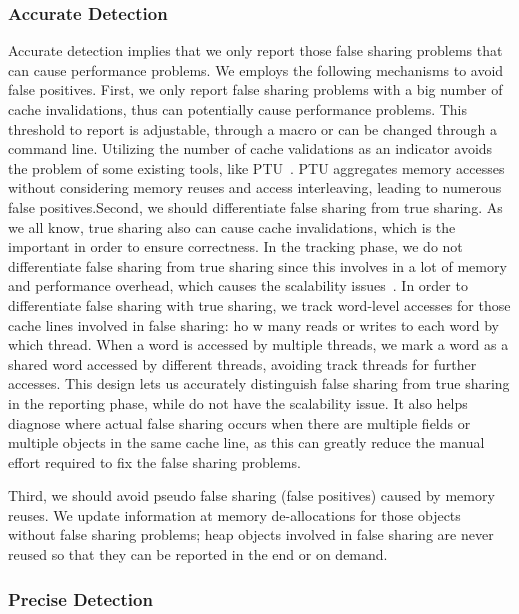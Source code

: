 \subsubsection{Accurate Detection}
\label{sec:accuratedetect}
Accurate detection implies that we only report those false sharing problems that can cause performance problems. We employs the following mechanisms to avoid false positives.
First, we only report false sharing problems with a big number of cache invalidations, thus can potentially cause performance problems. This threshold to report is adjustable, through a macro or can be changed through a command line. Utilizing the number of cache validations as an indicator avoids the problem of some existing tools, like PTU~\cite{detect:ptu, detect:intel}. PTU aggregates memory accesses without considering memory reuses and access interleaving, leading to numerous false positives.Second, we should differentiate false sharing from true sharing. As we all know, true sharing also can cause cache invalidations, which is the important in order to ensure correctness. In the tracking phase, we do not differentiate false sharing from true sharing since this involves in a lot of memory and performance overhead, which causes the scalability issues~\cite{qinzhao}. In order to differentiate false sharing with true sharing, we track word-level accesses for those cache lines involved in false sharing: ho
w many reads or writes to each word by which thread. When a word is accessed by multiple threads, we mark a word as a shared word accessed by different threads, avoiding track threads for further accesses. This design lets us accurately distinguish false sharing from true sharing in the reporting phase, while do not have the scalability issue. It also helps diagnose where actual false sharing occurs when there are multiple fields or multiple objects in the same cache line, as this can greatly reduce the manual effort required to fix the false sharing problems.

  
Third, we should avoid pseudo false sharing (false positives) caused by memory reuses.  We update information at memory de-allocations for those objects without false sharing problems; heap objects involved in false sharing are never reused so that they can be reported in the end or on demand.


\subsubsection{Precise Detection}
\label{sec:precisedetect}

